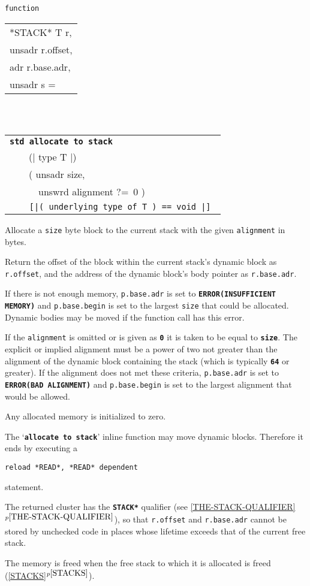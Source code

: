 \documentclass[12pt]{article}
\makeatletter
\newcommand{\TT}[1]{{\tt \bfseries #1}}
\newcommand{\ttstdkey}[1]{\TT{std #1}\index{#1@{\tt std #1}}}
\newcommand{\itemref}[1]{\ref{#1}$^{p\pageref{#1}}$}
\newcommand{\EOL}{\penalty \exhyphenpenalty}
\newcommand{\TS}{\hspace*{0in}\tt}
\newenvironment{indpar}[1][0.3in]%
	{\begin{list}{}%
		     {\setlength{\itemsep}{0in}%
		      \setlength{\topsep}{0in}%
		      \setlength{\parsep}{1ex}%
		      \setlength{\labelwidth}{#1}%
		      \setlength{\leftmargin}{#1}%
		      \addtolength{\leftmargin}{\labelsep}}%
	 \item}%
	{\end{list}}
\makeatother
\begin{document}
\begin{indpar}

{\tt function \begin{tabular}[t]{@{}l@{}}
              *STACK* T r, \\
	      unsadr r.offset, \\
	      adr r.base.adr, \\
	      unsadr s = \\
	      \end{tabular} \\
\TS~~~~\begin{tabular}[t]{@{}l@{}}
       \ttstdkey{allocate to stack} \label{ALLOCATE-TO-STACK} \\
       ~~~~(| type T |) \\
       ~~~~( unsadr size, \\
       ~~~~~~unswrd alignment ?=~0 ) \\
\TS~~~~[|( underlying type of T ) == void |] \\
       \end{tabular}}

\begin{indpar}
Allocate a {\tt size} byte block to the current stack with the given
{\tt alignment} in bytes.

Return the offset of the block within the current stack's dynamic
block as {\tt r.offset},
and the address of the dynamic block's body pointer as {\tt r.base.adr}.

If there is not enough memory,
{\tt p.base.adr} is set to \TT{ERROR(\EOL IN\-SUF\-FI\-CIENT MEMORY)}
and {\tt p.base.begin} is set to the largest {\tt size}
that could be allocated.  Dynamic bodies may be moved if the function
call has this error.


If the {\tt alignment} is omitted or is given as \TT{0} it is taken
to be equal to \TT{size}.  The explicit or implied
alignment must be a power of two not greater than the alignment
of the dynamic block containing the stack (which is typically
\TT{64} or greater).  If the alignment does not met these criteria,
{\tt p.base.adr} is set to \TT{ERROR(BAD ALIGNMENT)}
and {\tt p.base\EOL .begin} is set to the largest alignment
that would be allowed.

Any allocated memory is initialized to zero.

The `\TT{allocate to stack}' inline function may move dynamic blocks.
Therefore it ends by executing a
\begin{center}
{\tt reload *READ*, *READ* dependent}
\end{center}
statement.

The returned cluster has
the \TT{*STACK*} qualifier (see \itemref{THE-STACK-QUALIFIER}),
so that {\tt r.offset} and {\tt r.base.adr} cannot be
stored by unchecked code in places whose lifetime exceeds that of the current
free stack.

The memory is freed when the free stack to which it is allocated
is freed (\itemref{STACKS}).

\end{indpar}

\end{indpar}
\end{document}
